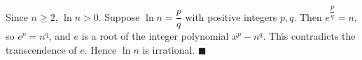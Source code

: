 Since $n\ge2$, $\ln n>0$. Suppose $\ln n=\dfrac pq$ with positive integers $p,q$. Then $e^{\dfrac pq}=n$, so $e^p=n^q$, and $e$ is a root of the integer polynomial $x^p-n^q$. This contradicts the transcendence of $e$. Hence $\ln n$ is irrational. $\blacksquare$
